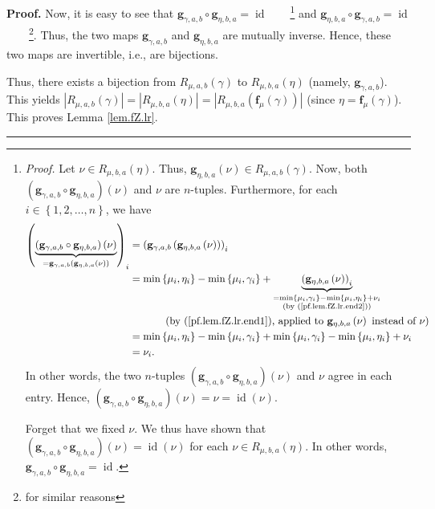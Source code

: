 \documentclass[numbers=enddot,12pt,final,onecolumn,notitlepage]{scrartcl}%
\theoremstyle{definition}
\newenvironment{proof}[1][Proof]{\noindent\textbf{#1.} }{\ \rule{0.5em}{0.5em}}
\newenvironment{verlong}{}{}
\begin{document}
\begin{proof}
\begin{verlong}
Now, it is easy to see that $\mathbf{g}_{\gamma,a,b}\circ\mathbf{g}_{\eta
,b,a}=\operatorname*{id}$\ \ \ \ \footnote{\textit{Proof.} Let $\nu\in
R_{\mu,b,a}\left(  \eta\right)  $. Thus, $\mathbf{g}_{\eta,b,a}\left(
\nu\right)  \in R_{\mu,a,b}\left(  \gamma\right)  $. Now, both $\left(
\mathbf{g}_{\gamma,a,b}\circ\mathbf{g}_{\eta,b,a}\right)  \left(  \nu\right)
$ and $\nu$ are $n$-tuples. Furthermore, for each $i\in\left\{  1,2,\ldots
,n\right\}  $, we have%
\begin{align*}
\left(  \underbrace{\left(  \mathbf{g}_{\gamma,a,b}\circ\mathbf{g}_{\eta
,b,a}\right)  \left(  \nu\right)  }_{=\mathbf{g}_{\gamma,a,b}\left(
\mathbf{g}_{\eta,b,a}\left(  \nu\right)  \right)  }\right)  _{i}  &  =\left(
\mathbf{g}_{\gamma,a,b}\left(  \mathbf{g}_{\eta,b,a}\left(  \nu\right)
\right)  \right)  _{i}\\
&  =\min\left\{  \mu_{i},\eta_{i}\right\}  -\min\left\{  \mu_{i},\gamma
_{i}\right\}  +\underbrace{\left(  \mathbf{g}_{\eta,b,a}\left(  \nu\right)
\right)  _{i}}_{\substack{=\min\left\{  \mu_{i},\gamma_{i}\right\}
-\min\left\{  \mu_{i},\eta_{i}\right\}  +\nu_{i}\\\text{(by
(\ref{pf.lem.fZ.lr.end2}))}}}\\
&  \ \ \ \ \ \ \ \ \ \ \left(  \text{by (\ref{pf.lem.fZ.lr.end1}), applied to
}\mathbf{g}_{\eta,b,a}\left(  \nu\right)  \text{ instead of }\nu\right) \\
&  =\min\left\{  \mu_{i},\eta_{i}\right\}  -\min\left\{  \mu_{i},\gamma
_{i}\right\}  +\min\left\{  \mu_{i},\gamma_{i}\right\}  -\min\left\{  \mu
_{i},\eta_{i}\right\}  +\nu_{i}\\
&  =\nu_{i}.
\end{align*}
In other words, the two $n$-tuples $\left(  \mathbf{g}_{\gamma,a,b}%
\circ\mathbf{g}_{\eta,b,a}\right)  \left(  \nu\right)  $ and $\nu$ agree in
each entry. Hence, $\left(  \mathbf{g}_{\gamma,a,b}\circ\mathbf{g}_{\eta
,b,a}\right)  \left(  \nu\right)  =\nu=\operatorname*{id}\left(  \nu\right)
$.
\par
Forget that we fixed $\nu$. We thus have shown that $\left(  \mathbf{g}%
_{\gamma,a,b}\circ\mathbf{g}_{\eta,b,a}\right)  \left(  \nu\right)
=\operatorname*{id}\left(  \nu\right)  $ for each $\nu\in R_{\mu,b,a}\left(
\eta\right)  $. In other words, $\mathbf{g}_{\gamma,a,b}\circ\mathbf{g}%
_{\eta,b,a}=\operatorname*{id}$.} and $\mathbf{g}_{\eta,b,a}\circ
\mathbf{g}_{\gamma,a,b}=\operatorname*{id}$\ \ \ \ \footnote{for similar
reasons}. Thus, the two maps $\mathbf{g}_{\gamma,a,b}$ and $\mathbf{g}%
_{\eta,b,a}$ are mutually inverse. Hence, these two maps are invertible, i.e.,
are bijections.
\end{verlong}

Thus, there exists a bijection from $R_{\mu,a,b}\left(  \gamma\right)  $ to
$R_{\mu,b,a}\left(  \eta\right)  $ (namely, $\mathbf{g}_{\gamma,a,b}$). This
yields $\left\vert R_{\mu,a,b}\left(  \gamma\right)  \right\vert =\left\vert
R_{\mu,b,a}\left(  \eta\right)  \right\vert =\left\vert R_{\mu,b,a}\left(
\mathbf{f}_{\mu}\left(  \gamma\right)  \right)  \right\vert $ (since
$\eta=\mathbf{f}_{\mu}\left(  \gamma\right)  $). This proves Lemma
\ref{lem.fZ.lr}.
\end{proof}
\end{document}
